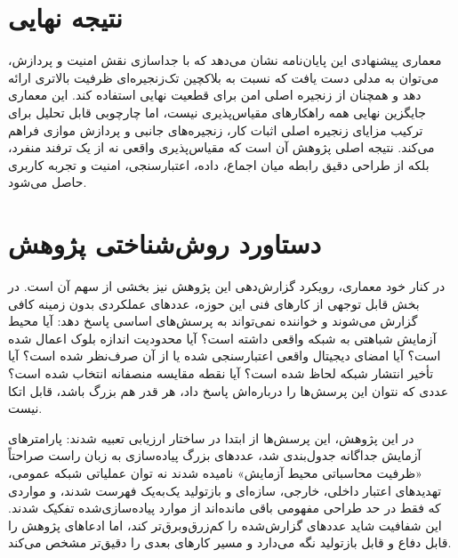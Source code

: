 \section{نتیجه نهایی}

معماری پیشنهادی این پایان‌نامه نشان می‌دهد که با جداسازی نقش امنیت و پردازش، می‌توان به مدلی دست یافت که نسبت به بلاکچین تک‌زنجیره‌ای ظرفیت بالاتری ارائه دهد و همچنان از زنجیره اصلی امن برای قطعیت نهایی استفاده کند. این معماری جایگزین نهایی همه راهکارهای مقیاس‌پذیری نیست، اما چارچوبی قابل تحلیل برای ترکیب مزایای زنجیره اصلی اثبات کار، زنجیره‌های جانبی و پردازش موازی فراهم می‌کند. نتیجه اصلی پژوهش آن است که مقیاس‌پذیری واقعی نه از یک ترفند منفرد، بلکه از طراحی دقیق رابطه میان اجماع، داده، اعتبارسنجی، امنیت و تجربه کاربری حاصل می‌شود.

\section{دستاورد روش‌شناختی پژوهش}

در کنار خود معماری، رویکرد گزارش‌دهی این پژوهش نیز بخشی از سهم آن است. در بخش قابل توجهی از کارهای فنی این حوزه، عددهای عملکردی بدون زمینه کافی گزارش می‌شوند و خواننده نمی‌تواند به پرسش‌های اساسی پاسخ دهد: آیا محیط آزمایش شباهتی به شبکه واقعی داشته است؟ آیا محدودیت اندازه بلوک اعمال شده است؟ آیا امضای دیجیتال واقعی اعتبارسنجی شده یا از آن صرف‌نظر شده است؟ آیا تأخیر انتشار شبکه لحاظ شده است؟ آیا نقطه مقایسه منصفانه انتخاب شده است؟ عددی که نتوان این پرسش‌ها را درباره‌اش پاسخ داد، هر قدر هم بزرگ باشد، قابل اتکا نیست.

در این پژوهش، این پرسش‌ها از ابتدا در ساختار ارزیابی تعبیه شدند: پارامترهای آزمایش جداگانه جدول‌بندی شد، عددهای بزرگ پیاده‌سازی به زبان راست صراحتاً «ظرفیت محاسباتی محیط آزمایش» نامیده شدند نه توان عملیاتی شبکه عمومی، تهدیدهای اعتبار داخلی، خارجی، سازه‌ای و بازتولید یک‌به‌یک فهرست شدند، و مواردی که فقط در حد طراحی مفهومی باقی مانده‌اند از موارد پیاده‌سازی‌شده تفکیک شدند. این شفافیت شاید عددهای گزارش‌شده را کم‌زرق‌وبرق‌تر کند، اما ادعاهای پژوهش را قابل دفاع و قابل بازتولید نگه می‌دارد و مسیر کارهای بعدی را دقیق‌تر مشخص می‌کند.
